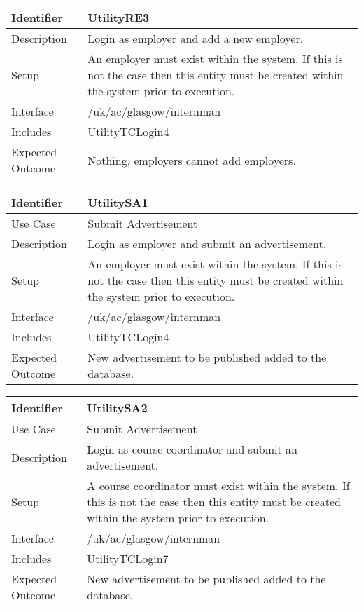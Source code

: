 \vspace{2em}

\begin{tabularx}{\textwidth}{|T|L|}
\hline
Identifier & UtilityRE3\\
\hline
Description & Login as employer and add a new employer.\\
\hline
Setup & An employer must exist within the system. If this is not the
case then this entity must be created within the system prior to execution. \\
\hline
Interface & /uk/ac/glasgow/internman \\
\hline
Includes & UtilityTCLogin4 \\
\hline
Expected Outcome & Nothing, employers cannot add employers.\\
\hline
\end{tabularx}

\vspace{2em}

\begin{tabularx}{\textwidth}{|T|L|}
\hline
Identifier & UtilitySA1\\
\hline
Use Case & Submit Advertisement \\
Description & Login as employer and submit an advertisement.\\
\hline
Setup & An employer must exist within the system. If this is not the
case then this entity must be created within the system prior to execution. \\
\hline
Interface & /uk/ac/glasgow/internman \\
\hline
Includes & UtilityTCLogin4 \\
\hline
Expected Outcome & New advertisement to be published added to the database.\\
\hline
\end{tabularx}

\vspace{2em}

\begin{tabularx}{\textwidth}{|T|L|}
\hline
Identifier & UtilitySA2\\
\hline
Use Case & Submit Advertisement \\
Description & Login as course coordinator and submit an advertisement.\\
\hline
Setup & A course coordinator must exist within the system. If this is
not the case then this entity must be created within the system prior
to execution.  \\
\hline
Interface & /uk/ac/glasgow/internman \\
\hline
Includes & UtilityTCLogin7 \\
\hline
Expected Outcome & New advertisement to be published added to the database.\\
\hline
\end{tabularx}

